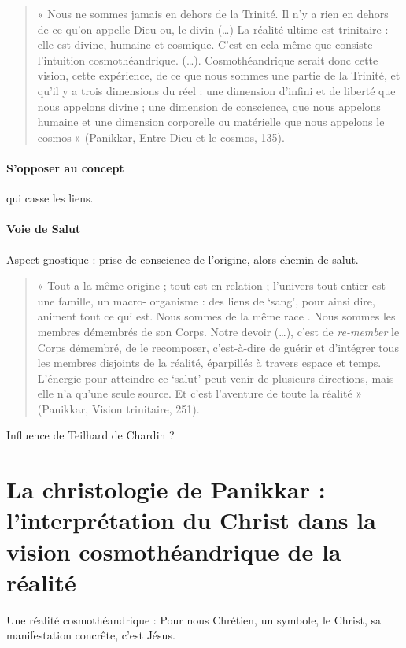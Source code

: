 \begin{quote}
    
« Nous ne sommes jamais en dehors de la Trinité. Il n’y a rien en dehors de ce qu’on appelle Dieu 
ou, le divin (…) La réalité ultime est trinitaire : elle est divine, humaine et cosmique. C’est en 
cela même que consiste l’intuition cosmothéandrique. (…). Cosmothéandrique serait donc cette 
vision, cette expérience, de ce que nous sommes une partie de la Trinité, et qu’il y a trois 
dimensions du réel : une dimension d’infini et de liberté que nous appelons divine ; une dimension 
de conscience, que nous appelons humaine  et une dimension corporelle ou matérielle que nous 
appelons le cosmos » (Panikkar, Entre Dieu et le cosmos, 135).

\end{quote}

\paragraph{S'opposer au concept} qui casse les liens. 

\paragraph{Voie de Salut} Aspect gnostique : prise de conscience de l'origine, alors chemin de salut.

\begin{quote}
    
« Tout a la même origine ; tout est en relation ; l’univers tout entier est une famille, un macro- 
organisme : des liens de ‘sang’, pour ainsi dire, animent tout ce qui est. Nous sommes de la même 
race . Nous sommes les membres démembrés de son Corps. Notre devoir (…), c’est de \textit{re-member} le Corps 
démembré, de le recomposer, c’est-à-dire de guérir et d’intégrer tous les membres disjoints de la 
réalité, éparpillés à travers espace et temps. L’énergie pour atteindre ce ‘salut’ peut venir de 
plusieurs directions, mais elle n’a qu’une seule source. Et c’est l’aventure de toute la réalité » 
(Panikkar, Vision trinitaire, 251).
\end{quote}

Influence de Teilhard de Chardin ?

\section{La christologie de Panikkar : l’interprétation du Christ dans la vision
cosmothéandrique de la réalité} 
Une réalité cosmothéandrique : Pour nous Chrétien, un symbole, le Christ, sa manifestation concrête, c'est Jésus.
